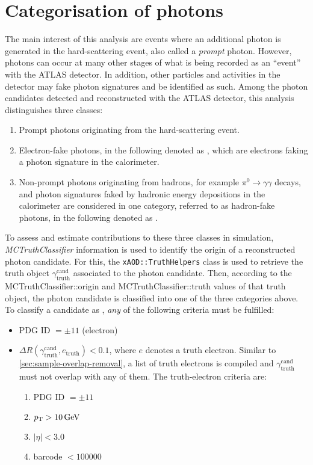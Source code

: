 
\section{Categorisation of photons}
\label{sec:photon-categorisation}

The main interest of this analysis are \ttbar events where an additional photon is generated in the hard-scattering event, also called a \emph{prompt} photon.
However, photons can occur at many other stages of what is being recorded as an \enquote{event} with the ATLAS detector.
In addition, other particles and activities in the detector may fake photon signatures and be identified as such.
Among the photon candidates detected and reconstructed with the ATLAS detector, this analysis distinguishes three classes:
%
\begin{enumerate}
\item Prompt photons originating from the hard-scattering event.
\item Electron-fake photons, in the following denoted as \emph{\efakes}, which are electrons faking a photon signature in the calorimeter.
\item Non-prompt photons originating from hadrons, for example $\pi^0 \to \gamma\gamma$ decays, and photon signatures faked by hadronic energy depositions in the calorimeter are considered in one category, referred to as hadron-fake photons, in the following denoted as \emph{\hfakes}.
\end{enumerate}
%
To assess and estimate contributions to these three classes in simulation, \emph{MCTruthClassifier} information is used to identify the origin of a reconstructed photon candidate.
For this, the \texttt{xAOD::TruthHelpers} class is used to retrieve the truth object $\gamma_{\mathrm{truth}}^{\mathrm{cand}}$ associated to the photon candidate.
Then, according to the MCTruthClassifier::origin and MCTruthClassifier::truth values of that truth object, the photon candidate is classified into one of the three categories above.
To classify a candidate as \efake, \emph{any} of the following criteria must be fulfilled:
%
\begin{itemize}
\item PDG ID $= \pm 11$ (electron)
\item $\Delta R (\gamma_{\mathrm{truth}}^{\mathrm{cand}}, e_{\mathrm{truth}}) < 0.1$, where $e$ denotes a truth electron.
  Similar to \cref{sec:sample-overlap-removal}, a list of truth electrons is compiled and $\gamma_{\mathrm{truth}}^{\mathrm{cand}}$ must not overlap with any of them.
The truth-electron criteria are:
  \begin{enumerate}
  \item PDG ID $= \pm 11$
  \item $\pT > \SI{10}{\GeV}$
  \item $|\eta| < 3.0$
  \item barcode $< \num{100000}$
  \end{enumerate}
\end{itemize}

